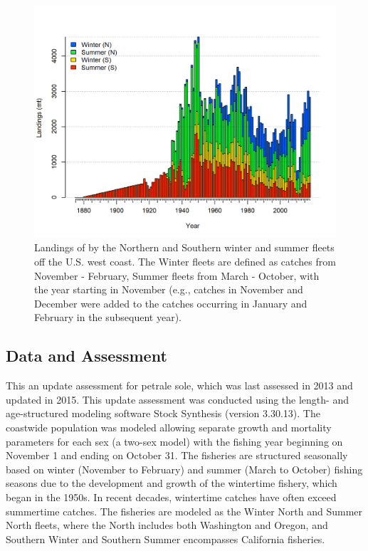 \documentclass[12pt,]{article}
\begin{document}
\FloatBarrier

\begin{figure}
\centering
\includegraphics{r4ss/plots_mod1/catch2 landings stacked.png}
\caption{Landings of by the Northern and Southern winter and summer
fleets off the U.S. west coast. The Winter fleets are defined as catches
from November - February, Summer fleets from March - October, with the
year starting in November (e.g., catches in November and December were
added to the catches occurring in January and February in the subsequent
year). \label{fig:Exec_catch1}}
\end{figure}

\FloatBarrier

\subsection*{Data and Assessment}\label{data-and-assessment}

This an update assessment for petrale sole, which was last assessed in
2013 and updated in 2015. This update assessment was conducted using the
length- and age-structured modeling software Stock Synthesis (version
3.30.13). The coastwide population was modeled allowing separate growth
and mortality parameters for each sex (a two-sex model) with the fishing
year beginning on November 1 and ending on October 31. The fisheries are
structured seasonally based on winter (November to February) and summer
(March to October) fishing seasons due to the development and growth of
the wintertime fishery, which began in the 1950s. In recent decades,
wintertime catches have often exceed summertime catches. The fisheries
are modeled as the Winter North and Summer North fleets, where the North
includes both Washington and Oregon, and Southern Winter and Southern
Summer encompasses California fisheries.
\end{document}
